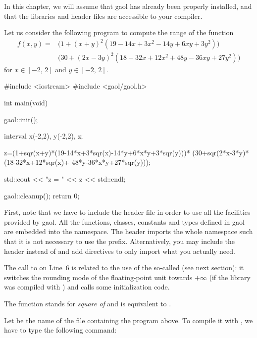 \documentclass{manual}
\newcommand{\itv}[2]{\ensuremath{[#1,\,#2]}}
\begin{document}
 In this chapter, we will assume that gaol has already been
 properly installed, and that the libraries and header files are
 accessible to your compiler.

 Let us consider the following program to compute the
 range of the function
 \begin{align*}
 f(x,y)=&\bigl(1+(x+y)^2(19-14x+3x^2-14y+6xy+3y^2)\bigr)\\
 &\bigl(30+(2x-3y)^2(18-32x+12x^2+48y-36xy+27y^2)\bigr)
 \end{align*}
 for $x\in\itv{-2}{2}$ and $y\in \itv{-2}{2}$.

 \begin{example}
 #include <iostream>
 #include <gaol/gaol.h>

 int main(void)
 {
   gaol::init();

   interval
     x(-2,2),
     y(-2,2), z;

   z=(1+sqr(x+y)*(19-14*x+3*sqr(x)-14*y+6*x*y+3*sqr(y)))*
     (30+sqr(2*x-3*y)*(18-32*x+12*sqr(x)+
        48*y-36*x*y+27*sqr(y)));

   std::cout << "z = " << z << std::endl;

   gaol::cleanup();
   return 0;
 }
 \end{example}

 First, note that we have to include the  header file in order to
 use all the facilities provided by gaol. All the functions, classes,
 constants and types defined in gaol are embedded into the 
 namespace. The  header imports the whole namespace such
 that it is not necessary to use the  prefix. Alternatively,
 you may include the 
 header instead of  and add  directives to only
 import what you actually need.
%
%
%

The call to  on Line~6 is related to the use of the
so-called  (see next section): it switches
the rounding mode of the floating-point unit towards $+\infty$ (if the
library was compiled with ) and
calls some initialization code.
%

 The  function stands for \emph{square of }
 and is equivalent to .

 Let  be the name of the file containing the program
 above. To compile it with , we have to type the following command:
%
\end{document}

